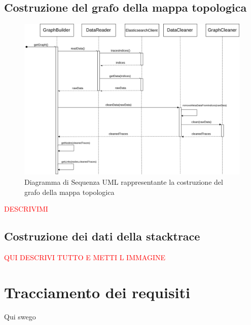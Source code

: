 \subsection{Costruzione del grafo della mappa topologica}

\begin{figure}[H]
	\centering
	\includegraphics[width=1\textwidth]{Images/DiagrammaSequenzaGraph.png}
	\caption{Diagramma di Sequenza UML rappresentante la costruzione del grafo della mappa topologica}
	\label{img:seqGraph}
\end{figure}

\textcolor{red}{DESCRIVIMI}

\subsection{Costruzione dei dati della stacktrace}
\textcolor{red}{QUI DESCRIVI TUTTO E METTI L IMMAGINE}

\section{Tracciamento dei requisiti}
\label{sec:Tracciamento}
Qui swego 
